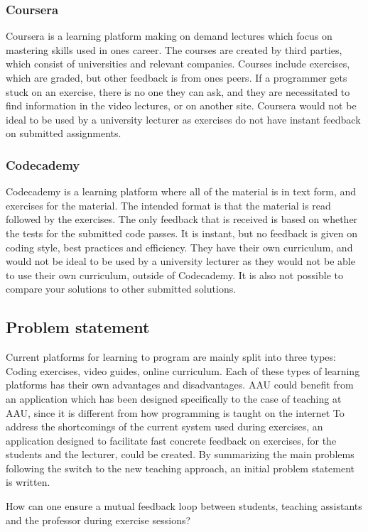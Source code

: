 \subsubsection*{Coursera}
Coursera is a learning platform making on demand lectures which focus on mastering skills used in ones career. 
The courses are created by third parties, which consist of universities and relevant companies. 
Courses include exercises, which are graded, but other feedback is from ones peers. If a programmer gets stuck on an exercise, there is no one they can ask, and they are necessitated to find information in the video lectures, or on another site\cite{Coursera}.
Coursera would not be ideal to be used by a university lecturer as exercises do not have instant feedback on submitted assignments.

\subsubsection*{Codecademy}
Codecademy is a learning platform where all of the material is in text form, and exercises for the material. The intended format is that the material is read followed by the exercises. The only feedback that is received is based on whether the tests for the submitted code passes. It is instant, but no feedback is given on coding style, best practices and efficiency\cite{Codecademy}. 
They have their own curriculum, and would not be ideal to be used by a university lecturer as they would not be able to use their own curriculum, outside of Codecademy. It is also not possible to compare your solutions to other submitted solutions.

\subsection{Problem statement}
    
Current platforms for learning to program are mainly split into three types: Coding exercises, video guides, online curriculum. 
Each of these types of learning platforms has their own advantages and disadvantages. AAU could benefit from an application which has been designed specifically to the case of teaching at AAU, since it is different from how programming is taught on the internet
To address the shortcomings of the current system used during exercises, an application designed to facilitate fast concrete feedback on exercises, for the students and the lecturer, could be created.
By summarizing the main problems following the switch to the new teaching approach, an initial problem statement is written.
\begin{displayquote}
How can one ensure a mutual feedback loop between students, teaching assistants and the professor during exercise sessions?
\end{displayquote} 


